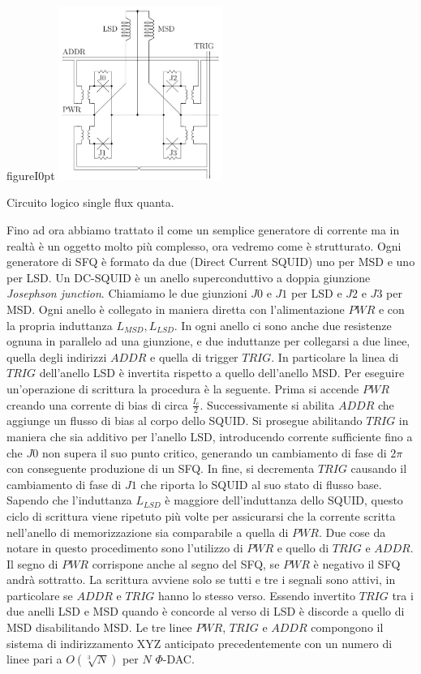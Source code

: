 \begin{wrapfloat}{figure}{I}{0pt}
\includegraphics[width=0.4\textwidth]{Immagini/sfq.jpg}
\caption{Circuito logico single flux quanta.}
\label{figura:sfq}
\end{wrapfloat}
\cite{ACI}Fino ad ora abbiamo trattato il  come un semplice generatore di corrente ma in realtà è un oggetto molto più complesso, ora vedremo come è strutturato. Ogni generatore di SFQ è formato da due  (Direct Current SQUID) uno per MSD e uno per LSD. Un DC-SQUID è un anello superconduttivo a doppia giunzione \textit{Josephson junction}. Chiamiamo le due giunzioni $J0$ e $J1$ per LSD e $J2$ e $J3$ per MSD. Ogni anello è collegato in maniera diretta con l'alimentazione $PWR$ e con la propria induttanza $L_{MSD}, L_{LSD}$. In ogni anello ci sono anche due resistenze ognuna in parallelo ad una giunzione, e due induttanze per collegarsi a due linee, quella degli indirizzi $ADDR$ e quella di trigger $TRIG$. In particolare la linea di $TRIG$ dell'anello LSD è invertita rispetto a quello dell'anello MSD. Per eseguire un'operazione di scrittura la procedura è la seguente. Prima si accende $PWR$ creando una corrente di bias di circa $\frac{I_c}{2}$. Successivamente si abilita $ADDR$ che aggiunge un flusso di bias al corpo dello SQUID. Si prosegue abilitando $TRIG$ in maniera che sia additivo per l'anello LSD, introducendo corrente sufficiente fino a che $J0$ non supera il suo punto critico, generando un cambiamento di fase di $2\pi$ con conseguente produzione di un SFQ.
In fine, si decrementa $TRIG$ causando il cambiamento di fase di $J1$ che riporta lo SQUID al suo stato di flusso base. Sapendo che l'induttanza $L_{LSD}$ è maggiore dell'induttanza dello SQUID, questo ciclo di scrittura viene ripetuto più volte per assicurarsi che la corrente scritta nell'anello di memorizzazione sia comparabile a quella di $PWR$. Due cose da notare in questo procedimento sono l'utilizzo di $PWR$ e quello di $TRIG$ e $ADDR$. Il segno di $PWR$ corrispone anche al segno del SFQ, se $PWR$ è negativo il SFQ andrà sottratto. La scrittura avviene solo se tutti e tre i segnali sono attivi, in particolare se $ADDR$ e $TRIG$ hanno lo stesso verso. Essendo invertito $TRIG$ tra i due anelli LSD e MSD quando è concorde al verso di LSD è discorde a quello di MSD disabilitando MSD. Le tre linee $PWR$, $TRIG$ e $ADDR$ compongono il sistema di indirizzamento XYZ anticipato precedentemente con un numero di linee pari a $O(\sqrt[3]{N})$ per $N$ $\Phi$-DAC.
